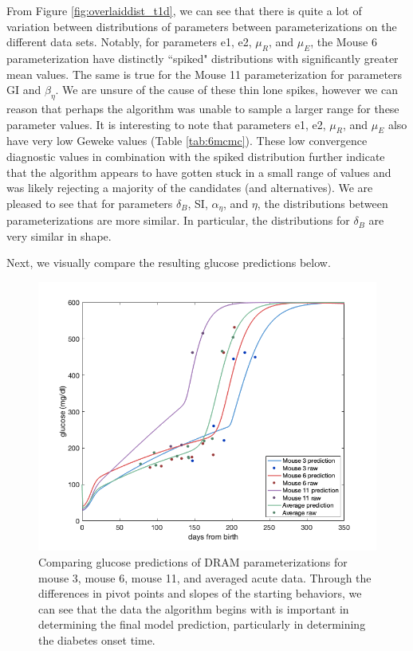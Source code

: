 From Figure \ref{fig:overlaiddist_t1d}, we can see that there is quite a lot of variation between distributions of parameters between parameterizations on the different data sets. Notably, for parameters e1, e2, $\mu_R$, and $\mu_E$, the Mouse 6 parameterization have distinctly ``spiked" distributions with significantly greater mean values. The same is true for the Mouse 11 parameterization for parameters GI and $\beta_\eta$. We are unsure of the cause of these thin lone spikes, however we can reason that perhaps the algorithm was unable to sample a larger range for these parameter values. It is interesting to note that parameters e1, e2, $\mu_R$, and $\mu_E$ also have very low Geweke values (Table \ref{tab:6mcmc}). These low convergence diagnostic values in combination with the spiked distribution further indicate that the algorithm appears to have gotten stuck in a small range of values and was likely rejecting a majority of the candidates (and alternatives). We are pleased to see that for parameters $\delta_B$, SI, $\alpha_\eta$, and $\eta$, the distributions between parameterizations are more similar. In particular, the distributions for $\delta_B$ are very similar in shape.
\par Next, we visually compare the resulting glucose predictions below.
\begin{figure}[H]
    \centering
    \includegraphics[width=15cm]{MCMC_figs/dram_t1d_final/comp_3_6_11_avg_finalfig.png}
    \caption{Comparing glucose predictions of DRAM parameterizations for mouse 3, mouse 6, mouse 11, and averaged acute data. Through the differences in pivot points and slopes of the starting behaviors, we can see that the data the algorithm begins with is important in determining the final model prediction, particularly in determining the diabetes onset time.}
    \label{fig:21mcmc}
\end{figure}
